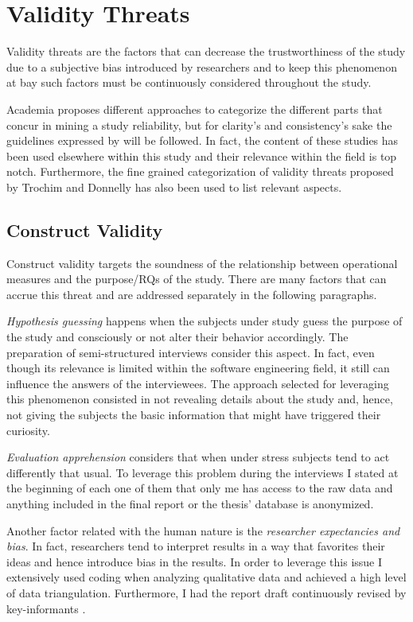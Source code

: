 \chapter{Validity Threats} \label{validity_threats}

Validity threats are the factors that can decrease the trustworthiness of the study due to a subjective bias introduced by researchers and to keep this phenomenon at bay such factors must be continuously considered throughout the study.

Academia proposes different approaches to categorize the different parts that concur in mining a study reliability, but for clarity's and consistency's sake the guidelines expressed by \cite{case_study_guide,case_study_software_engineering} will be followed. In fact, the content of these studies has been used elsewhere within this study and their relevance within the field is top notch. Furthermore, the fine grained categorization of validity threats proposed by Trochim and Donnelly \cite{validity_threats} has also been used to list relevant aspects.

\section{Construct Validity}
Construct validity targets the soundness of the relationship between operational measures and the purpose/RQs of the study. There are many factors that can accrue this threat and are addressed separately in the following paragraphs.

    \textit{Hypothesis guessing} happens when the subjects under study guess the purpose of the study and consciously or not alter their behavior accordingly. The preparation of semi-structured interviews consider this aspect. In fact, even though its relevance is limited within the software engineering field, it still can influence the answers of the interviewees. The approach selected for leveraging this phenomenon consisted in not revealing details about the study and, hence, not giving the subjects the basic information that might have triggered their curiosity.

    \textit{Evaluation apprehension} considers that when under stress subjects tend to act differently that usual. To leverage this problem during the interviews I stated at the beginning of each one of them that only me has access to the raw data and anything included in the final report or the thesis' database is anonymized.

    Another factor related with the human nature is the \textit{researcher expectancies and bias}. In fact, researchers tend to interpret results in a way that favorites their ideas and hence introduce bias in the results. In order to leverage this issue I extensively used coding when analyzing qualitative data and achieved a high level of data triangulation. Furthermore, I had the report draft continuously revised by key-informants \cite{case_study_guide}.

